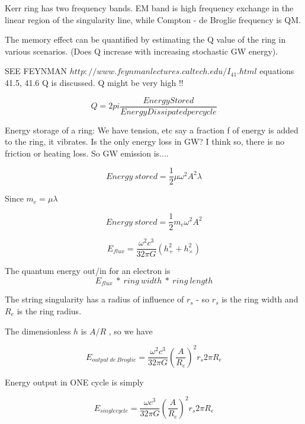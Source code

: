 \documentclass[../rzero]{subfiles}
\begin{document}
Kerr ring has two frequency bands. EM band is high frequency exchange in the linear region of the singularity line, while Compton - de Broglie frequency is QM.

The memory effect can be quantified by estimating the Q value of the ring in various scenarios. (Does Q increase with increasing stochastic GW energy).

SEE FEYNMAN $http://www.feynmanlectures.caltech.edu/I_41.html$ equations 41.5, 41.6 Q is discussed. Q might be very high !! 

\begin{equation}
Q = 2 pi \frac{Energy Stored}{Energy Dissipated per cycle}
 \end{equation}
 
 Energy storage of a ring:
 We have tension, etc say a fraction f of energy is added to the ring, it vibrates. Is the only energy loss in GW? I think so, there is no friction or heating loss. So GW emission is....
 
\begin{equation}
Energy\ stored = \frac{1}{2} \mu \omega^2 A^2 \lambda 
 \end{equation}
 
 Since $m_e = \mu \lambda$
 
 \begin{equation}
Energy\ stored = \frac{1}{2} m_e \omega^2 A^2 
 \end{equation}
 

\begin{equation}
	E_{flux} = \frac{\omega^2 c^3}{32\pi G }( h_+^2 + h_\times^2)
\end{equation}

The quantum energy out/in for an electron is 
\begin{equation}
	E_{flux}\ * \ ring\ width\ *\ ring\ length
\end{equation}

The string singularity has a radius of influence of $r_s$ - so $r_s$ is the ring width and $R_e$ is the ring radius.

The dimensionless $h$ is $A/R$ , so we have 

\begin{equation}
	E_{output\ de\ Broglie} = \frac{\omega^2 c^3}{32\pi G }(\frac{A}{R_e})^2 r_s 2 \pi R_e
\end{equation}

Energy output in ONE cycle is simply 

\begin{equation}
	E_{single cycle} = \frac{\omega c^3}{32\pi G }(\frac{A}{R_e})^2 r_s 2 \pi R_e
\end{equation}
\end{document}
